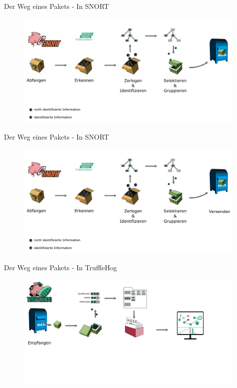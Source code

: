 \begin{frame}{Der Weg eines Pakets - In SNORT}
	\begin{figure}
		\centering
		\includegraphics[width=\textwidth]{./images/path_snort/4.png}
	\end{figure}
\end{frame}

\begin{frame}{Der Weg eines Pakets - In SNORT}
	\begin{figure}
		\centering
		\includegraphics[width=\textwidth]{./images/path_snort/5.png}
	\end{figure}
\end{frame}

\begin{frame}{Der Weg eines Pakets - In TruffleHog}
	\begin{figure}
		\centering
		\includegraphics[width=\textwidth]{./images/path_trufflehog/1.png}
	\end{figure}
\end{frame}

